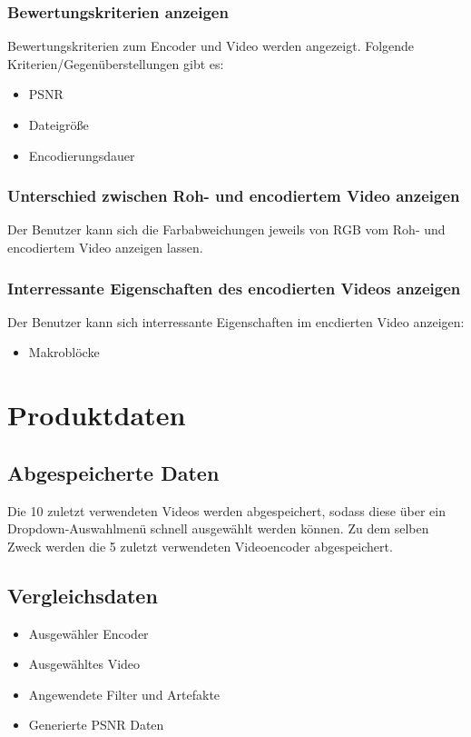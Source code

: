 \documentclass[parskip=full]{scrartcl}
\begin{document}
\subsubsection{Bewertungskriterien anzeigen}
Bewertungskriterien zum Encoder und Video werden angezeigt. Folgende Kriterien/Gegenüberstellungen gibt es:
\begin{itemize}
\item PSNR
\item Dateigröße
\item Encodierungsdauer
\end{itemize}
\subsubsection{Unterschied zwischen Roh- und encodiertem Video anzeigen}
Der Benutzer kann sich die Farbabweichungen jeweils von RGB vom Roh- und encodiertem Video anzeigen lassen.
\subsubsection{Interressante Eigenschaften des encodierten Videos anzeigen}
Der Benutzer kann sich interressante Eigenschaften im encdierten Video anzeigen:
\begin{itemize}
\item Makroblöcke
\end{itemize}
\newpage
\section{Produktdaten}
\subsection{Abgespeicherte Daten}
Die 10 zuletzt verwendeten Videos werden abgespeichert, sodass diese über ein Dropdown-Auswahlmenü schnell ausgewählt werden können. Zu dem selben Zweck werden die 5 zuletzt verwendeten Videoencoder abgespeichert.
\subsection{Vergleichsdaten}
\begin{itemize}
\item Ausgewähler Encoder
\item Ausgewähltes Video
\item Angewendete Filter und Artefakte
\item Generierte PSNR Daten
\end{itemize}
\newpage
\end{document}
